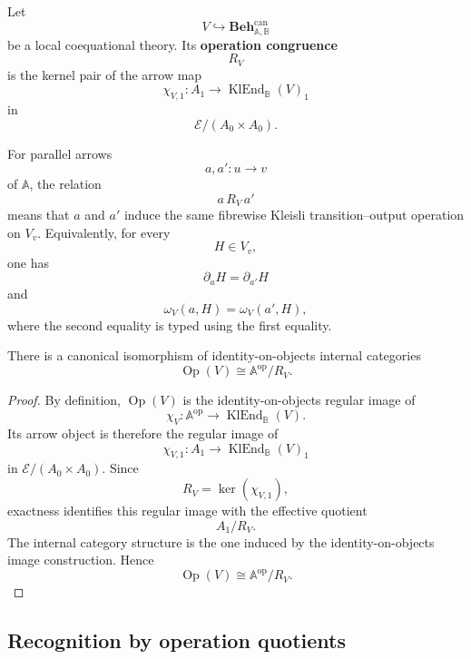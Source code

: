 \begin{definition}
\label{def:operation-congruence-of-local-theory}
    Let
    \[
        V\hookrightarrow
        \mathbf{Beh}^{\mathrm{can}}_{\mathbb A,\mathbb B}
    \]
    be a local coequational theory. Its \textbf{operation congruence}
    \[
        R_V
    \]
    is the kernel pair of the arrow map
    \[
        \chi_{V,1}:A_1\to
        \operatorname{KlEnd}_{\mathbb B}(V)_1
    \]
    in
    \[
        \mathcal E/(A_0\times A_0).
    \]
\end{definition}

For parallel arrows
\[
    a,a':u\to v
\]
of \(\mathbb A\), the relation
\[
    a\,R_V\,a'
\]
means that \(a\) and \(a'\) induce the same fibrewise Kleisli
transition--output operation on \(V_v\). Equivalently, for every
\[
    H\in V_v,
\]
one has
\[
    \partial_aH=\partial_{a'}H
\]
and
\[
    \omega_V(a,H)=\omega_V(a',H),
\]
where the second equality is typed using the first equality.

\begin{proposition}
\label{prop:operation-image-as-operation-quotient-eilenberg}
    There is a canonical isomorphism of identity-on-objects internal categories
    \[
        \operatorname{Op}(V)
        \cong
        \mathbb A^{\mathrm{op}}/R_V.
    \]
\end{proposition}

\begin{proof}
    By definition, \(\operatorname{Op}(V)\) is the identity-on-objects regular
    image of
    \[
        \chi_V:
        \mathbb A^{\mathrm{op}}
        \to
        \operatorname{KlEnd}_{\mathbb B}(V).
    \]
    Its arrow object is therefore the regular image of
    \[
        \chi_{V,1}:A_1\to
        \operatorname{KlEnd}_{\mathbb B}(V)_1
    \]
    in \(\mathcal E/(A_0\times A_0)\). Since
    \[
        R_V=\ker(\chi_{V,1}),
    \]
    exactness identifies this regular image with the effective quotient
    \[
        A_1/R_V.
    \]
    The internal category structure is the one induced by the
    identity-on-objects image construction. Hence
    \[
        \operatorname{Op}(V)
        \cong
        \mathbb A^{\mathrm{op}}/R_V.
    \]
\end{proof}

\subsection{Recognition by operation quotients}
\label{subsec:recognition-operation-quotients}

